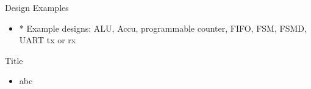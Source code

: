 \begin{frame}[fragile]{Design Examples}
\begin{itemize}
\item    * Example designs: ALU, Accu, programmable counter, FIFO, FSM, FSMD, UART tx or rx

\end{itemize}
\end{frame}



\begin{frame}[fragile]{Title}
\begin{itemize}
\item abc
\end{itemize}
\end{frame}
